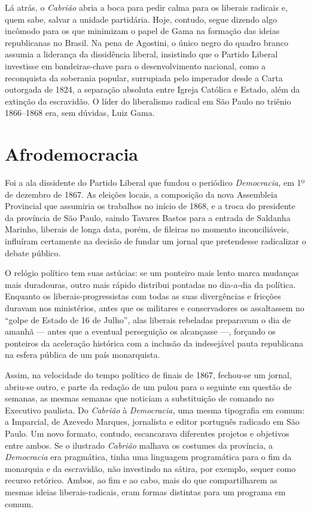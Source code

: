 Lá atrás, o \emph{Cabrião} abria a boca para pedir calma para os
liberais radicais e, quem sabe, salvar a unidade partidária. Hoje,
contudo, segue dizendo algo incômodo para os que minimizam o papel de
Gama na formação das ideias republicanas no Brasil. Na pena de Agostini,
o único negro do quadro branco assumia a liderança da dissidência
liberal, insistindo que o Partido Liberal investisse em bandeiras-chave
para o desenvolvimento nacional, como a reconquista da soberania
popular, surrupiada pelo imperador desde a Carta outorgada de 1824, a
separação absoluta entre Igreja Católica e Estado, além da extinção da
escravidão. O líder do liberalismo radical em São Paulo no triênio
1866--1868 era, sem dúvidas, Luiz Gama.

\section{Afrodemocracia}

Foi a ala dissidente do Partido Liberal que fundou o periódico
\emph{Democracia,} em 1º de dezembro de 1867. As eleições locais, a
composição da nova Assembleia Provincial que assumiria os trabalhos no
início de 1868, e a troca do presidente da província de São Paulo,
saindo Tavares Bastos para a entrada de Saldanha Marinho, liberais de
longa data, porém, de fileiras no momento inconciliáveis, influíram
certamente na decisão de fundar um jornal que pretendesse radicalizar o
debate público.

O relógio político tem suas astúcias: se um ponteiro mais lento marca
mudanças mais duradouras, outro mais rápido distribui pontadas no
dia-a-dia da política. Enquanto os liberais-progressistas com todas as
suas divergências e fricções duravam nos ministérios, antes que os
militares e conservadores os assaltassem no ``golpe de Estado de 16 de
Julho'', alas liberais rebeladas preparavam o dia de amanhã --- antes que
a eventual perseguição os alcançasse ---, forçando os ponteiros da
aceleração histórica com a inclusão da indesejável pauta republicana na
esfera pública de um país monarquista.

Assim, na velocidade do tempo político de finais de 1867, fechou-se um
jornal, abriu-se outro, e parte da redação de um pulou para o seguinte
em questão de semanas, as mesmas semanas que noticiam a substituição de
comando no Executivo paulista. Do \emph{Cabrião} à \emph{Democracia,}
uma mesma tipografia em comum: a Imparcial, de Azevedo Marques,
jornalista e editor português radicado em São Paulo. Um novo formato,
contudo, escancarava diferentes projetos e objetivos entre ambos. Se o
ilustrado \emph{Cabrião} malhava os costumes da província, a
\emph{Democracia} era pragmática, tinha uma linguagem programática para
o fim da monarquia e da escravidão, não investindo na sátira, por
exemplo, sequer como recurso retórico. Ambos, ao fim e ao cabo, mais do
que compartilharem as mesmas ideias liberais-radicais, eram formas
distintas para um programa em comum.

